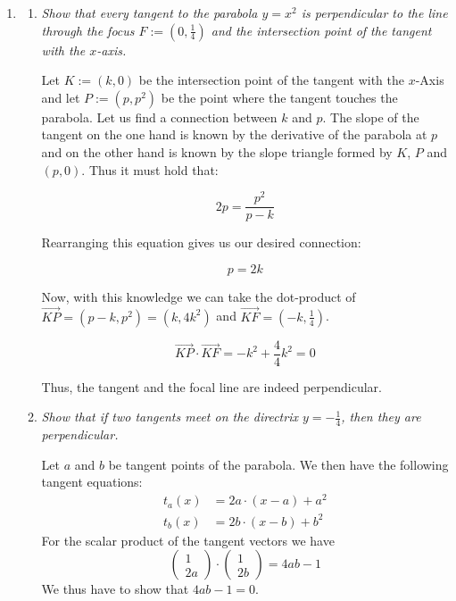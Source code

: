 \documentclass[a4paper,11pt,notitlepage,fullpage]{paper}
\theoremstyle{plain}
\theoremstyle{definition}
\begin{document}
\begin{enumerate}

\item
\begin{enumerate}
\item \emph{Show that every tangent to the parabola $y=x^2$ is perpendicular to the line through the focus $F := (0, \frac{1}{4})$ and the intersection point of the tangent with the $x$-axis.}

Let $K := (k, 0)$ be the intersection point of the tangent with the $x$-Axis and let $P := (p, p^2)$ be the point where the  tangent touches the parabola. Let us find a connection between $k$ and $p$. The slope of the tangent on the one hand is known by the derivative of the parabola at $p$ and on the other hand is known by the slope triangle formed by $K$, $P$ and $(p,0)$. Thus it must hold that:

\begin{equation*}
2p = \frac{p^2}{p-k}
\end{equation*}

Rearranging this equation gives us our desired connection:

\begin{equation*}
p = 2k
\end{equation*}

Now, with this knowledge we can take the dot-product of $\overrightarrow{KP} = (p-k, p^2) = (k, 4k^2)$ and $\overrightarrow{KF} = (-k, \frac{1}{4})$.

\begin{equation*}
\overrightarrow{KP} \cdot \overrightarrow{KF} = -k^2 + \frac{4}{4}k^2 = 0
\end{equation*}

Thus, the tangent and the focal line are indeed perpendicular.

\item \emph{Show that if two tangents meet on the directrix $y = -\frac{1}{4}$, then they are perpendicular.}

Let $a$ and $b$ be tangent points of the parabola. We then have the following tangent equations:
\begin{align*}
	t_a(x)&=2a\cdot (x-a)+a^2\\
	t_b(x)&=2b\cdot (x-b)+b^2
\end{align*}
For the scalar product of the tangent vectors we have
\begin{equation*}
\begin{pmatrix}
1 \\ 2a\end{pmatrix} \cdot \begin{pmatrix} 1 \\ 2b\end{pmatrix}=4ab-1
\end{equation*}
We thus have to show that $4ab-1=0$.


\end{enumerate}
\end{enumerate}
\end{document}
